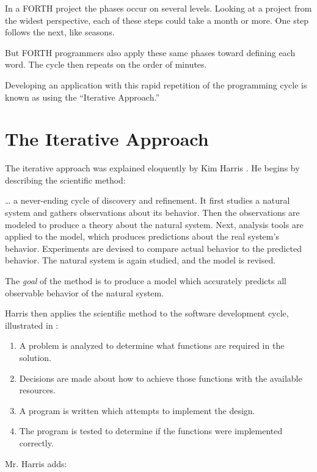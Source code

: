 In a FORTH project the phases occur on several levels. Looking at a
project from the widest perspective, each of these steps could take a
month or more.  One step follows the next, like seasons.


But FORTH programmers also apply these same phases toward
defining each word. The cycle then repeats on the order of minutes.

Developing an application with this rapid repetition of the
programming cycle is known as using the ``Iterative Approach.''

\section{The Iterative Approach}

The iterative approach was explained eloquently by Kim
Harris \cite{harris81}. He begins by describing the scientific method:

\begin{tfquot}
\dots{} a never-ending cycle of discovery and refinement. It first
studies a natural system and gathers observations about its behavior.
Then the observations are modeled to produce a theory about the
natural system. Next, analysis tools are applied to the model, which
produces predictions about the real system's behavior. Experiments
are devised to compare actual behavior to the predicted behavior. The
natural system is again studied, and the model is revised.

The \emph{goal} of the method is to produce a model which accurately predicts all
observable behavior of the natural system.
\end{tfquot}
Harris then applies the scientific method to the software development
cycle, illustrated in :


\begin{enumerate}
\item A problem is analyzed to determine what functions are required in the solution.
\item Decisions are made about how to achieve those functions with
the available resources.
\item A program is written which attempts to implement the design.
\item The program is tested to determine if the functions were implemented correctly.
\end{enumerate}
Mr. Harris adds:

